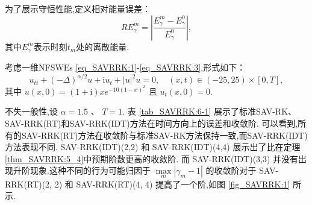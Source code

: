 为了展示守恒性能,定义相对能量误差：
\begin{equation}\label{eq_SAVRRK:105}
	R E_{\gamma}^{m} = \left|\frac{E_{\gamma}^{m} - E_{\gamma}^{0}}{E_{\gamma}^{0}}\right|,
\end{equation}
其中$E_{\gamma}^{m}$表示时刻$t_m$处的离散能量.

\begin{example}\label{exp_SAVRRK:1}
	\cite{ranLinearlyImplicitConservative2016} 
	考虑一维NFSWEs \eqref{eq_SAVRRK:1}-\eqref{eq_SAVRRK:3},形式如下：
	\begin{equation}\label{eq_SAVRRK:108}
		u_{t t}+(-\Delta)^{\alpha / 2} u+\mathrm{i}u_t+|u|^2 u=0, \quad (x,t)\in  (-25, 25)\times[0, T],
	\end{equation}
	其中 $u(x, 0)=(1+\mathrm{i}) x e^{-10(1-x)^2}$ 且 $u_t(x, 0)=0$.
	\end{example}
		
	
		
	不失一般性,设 $\alpha=1.5$ 、 $T=1$. %
	表 \ref{tab_SAVRRK:6-1} 展示了标准SAV-RK、SAV-RRK(RT)和SAV-RRK(IDT)方法在时间方向上的误差和收敛阶.
	可以看到,所有的SAV-RRK(RT)方法在收敛阶与标准SAV-RK方法保持一致,而SAV-RRK(IDT)方法表现不同.
	SAV-RRK(IDT)(2,2) 和 SAV-RRK(IDT)(4,4) 展示出了比在定理\ref{thm_SAVRRK:5_4}中预期阶数更高的收敛阶.
	而 SAV-RRK(IDT)(3,3) 并没有出现升阶现象.这种不同的行为可能归因于 $\max\limits _m\left|\gamma_m-1\right|$ 
	的收敛阶对于 SAV-RRK(RT)(2, 2) 和 SAV-RRK(RT)(4, 4) 提高了一个阶,如图 \ref{fig_SAVRRK:1} 所示.


